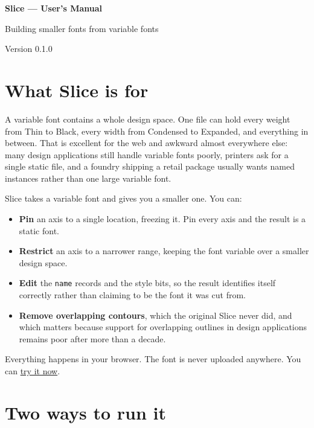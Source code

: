\documentclass[11pt,a4paper]{article}
\begin{document}
\begin{titlepage}
\centering
\vspace*{5cm}
{\Huge\bfseries Slice — User's Manual\par}
\vspace{1cm}
{\Large Building smaller fonts from variable fonts\par}
\vspace{2cm}
{\large Version 0.1.0\par}
\vfill
\end{titlepage}
\tableofcontents
\newpage
\section{What Slice is for}

A variable font contains a whole design space. One file can hold every weight from Thin to Black, every width from Condensed to Expanded, and everything in between. That is excellent for the web and awkward almost everywhere else: many design applications still handle variable fonts poorly, printers ask for a single static file, and a foundry shipping a retail package usually wants named instances rather than one large variable font.

Slice takes a variable font and gives you a smaller one. You can:

\begin{itemize}
  \item \textbf{Pin} an axis to a single location, freezing it. Pin every axis and the result is a static font.
  \item \textbf{Restrict} an axis to a narrower range, keeping the font variable over a smaller design space.
  \item \textbf{Edit} the \texttt{name} records and the style bits, so the result identifies itself correctly rather than claiming to be the font it was cut from.
  \item \textbf{Remove overlapping contours}, which the original Slice never did, and which matters because support for overlapping outlines in design applications remains poor after more than a decade.
\end{itemize}

Everything happens in your browser. The font is never uploaded anywhere. You can \href{https://googlefonts.github.io/slice-web/app/}{try it now}.

\section{Two ways to run it}
\end{document}
